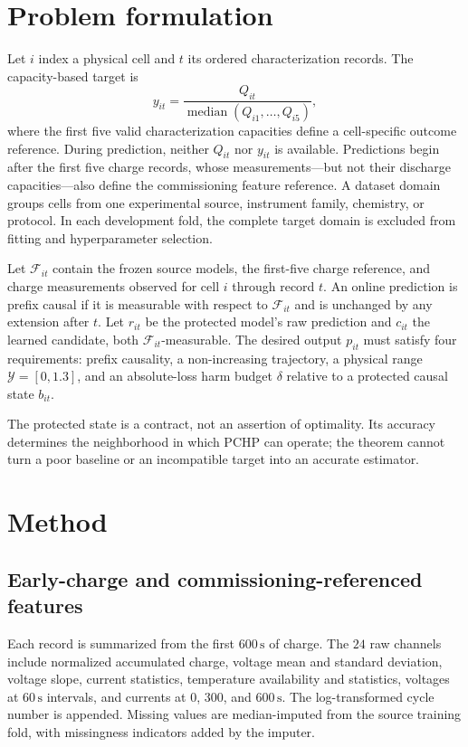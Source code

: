 \documentclass[11pt]{article}
\begin{document}
\section{Problem formulation}

Let $i$ index a physical cell and $t$ its ordered characterization records. The capacity-based target is
\begin{equation}
  y_{it}=\frac{Q_{it}}{\operatorname{median}(Q_{i1},\ldots,Q_{i5})},
  \label{eq:soh}
\end{equation}
where the first five valid characterization capacities define a cell-specific outcome reference. During prediction, neither $Q_{it}$ nor $y_{it}$ is available. Predictions begin after the first five charge records, whose measurements---but not their discharge capacities---also define the commissioning feature reference. A dataset domain groups cells from one experimental source, instrument family, chemistry, or protocol. In each development fold, the complete target domain is excluded from fitting and hyperparameter selection.

Let $\mathcal F_{it}$ contain the frozen source models, the first-five charge reference, and charge measurements observed for cell $i$ through record $t$. An online prediction is prefix causal if it is measurable with respect to $\mathcal F_{it}$ and is unchanged by any extension after $t$. Let $r_{it}$ be the protected model's raw prediction and $c_{it}$ the learned candidate, both $\mathcal F_{it}$-measurable. The desired output $p_{it}$ must satisfy four requirements: prefix causality, a non-increasing trajectory, a physical range $\mathcal Y=[0,1.3]$, and an absolute-loss harm budget $\delta$ relative to a protected causal state $b_{it}$.

The protected state is a contract, not an assertion of optimality. Its accuracy determines the neighborhood in which PCHP can operate; the theorem cannot turn a poor baseline or an incompatible target into an accurate estimator.

\section{Method}

\subsection{Early-charge and commissioning-referenced features}

Each record is summarized from the first $600\,\mathrm{s}$ of charge. The $24$ raw channels include normalized accumulated charge, voltage mean and standard deviation, voltage slope, current statistics, temperature availability and statistics, voltages at $60\,\mathrm{s}$ intervals, and currents at $0$, $300$, and $600\,\mathrm{s}$. The log-transformed cycle number is appended. Missing values are median-imputed from the source training fold, with missingness indicators added by the imputer.
\end{document}
